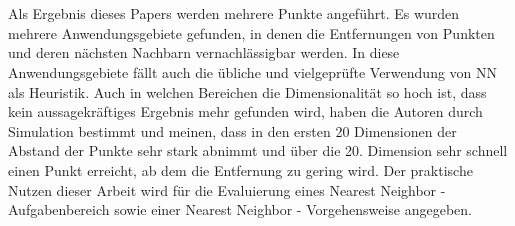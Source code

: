 \documentclass{article}
\begin{document}
\\
\\
Als Ergebnis dieses Papers werden mehrere Punkte angeführt. Es wurden mehrere Anwendungsgebiete gefunden, in denen die Entfernungen von Punkten und deren nächsten Nachbarn vernachlässigbar werden. In diese Anwendungsgebiete fällt auch die übliche und vielgeprüfte Verwendung von NN als Heuristik. 
Auch in welchen Bereichen die Dimensionalität so hoch ist, dass kein aussagekräftiges Ergebnis mehr gefunden wird, haben die Autoren durch Simulation bestimmt und meinen, dass in den ersten 20 Dimensionen der Abstand der Punkte sehr stark abnimmt und über die 20. Dimension sehr schnell einen Punkt erreicht, ab dem die Entfernung zu gering wird. 
Der praktische Nutzen dieser Arbeit wird für die Evaluierung eines Nearest Neighbor - Aufgabenbereich sowie einer Nearest Neighbor - Vorgehensweise angegeben. 
\end{document}

